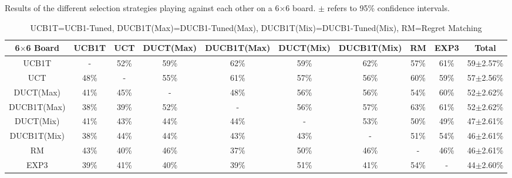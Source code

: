 \documentclass{article}
\begin{document}
\begin{table}\scriptsize
\caption{Results of the different selection strategies playing against each other on a 6$\times$6 board. $\pm$ refers to 95\% confidence intervals.}
\centering
\begin{tabular}{|c||c|c|c|c|c|c|c|c|c|}
									\hline
	6$\times$6 Board	& UCB1T 	& UCT		& DUCT(Max)	& DUCB1T(Max)	& DUCT(Mix)	& DUCB1T(Mix)	& RM	& EXP3	& Total			\\ \hline
	UCB1T							& -				& 52\%	& 59\%			& 62\%				& 59\%			& 62\%				& 57\%& 61\%	& 59$\pm$2.57\%		\\ \hline
	UCT								& 48\%		& -			& 55\%			& 61\%				& 57\%			& 56\%				& 60\%& 59\%	& 57$\pm$2.56\%		\\ \hline
	DUCT(Max)					& 41\%		& 45\%	& -					& 48\%				& 56\%			& 56\%				& 54\%& 60\%	& 52$\pm$2.62\%		\\ \hline
	DUCB1T(Max)				& 38\%		& 39\%	& 52\%			& -						& 56\%			& 57\%				& 63\%& 61\%	& 52$\pm$2.62\%		\\ \hline
	DUCT(Mix)					& 41\%		& 43\%	& 44\%			& 44\%				& -					& 53\%				& 50\%& 49\%	& 47$\pm$2.61\%		\\ \hline
	DUCB1T(Mix)				& 38\%		& 44\%	& 44\%			& 43\%				& 43\%			& -						& 51\%& 54\%	& 46$\pm$2.61\%		\\ \hline
	RM								& 43\%		& 40\%	& 46\%			& 37\%				& 50\%			& 46\%				& -		& 46\%	& 46$\pm$2.61\%		\\ \hline
	EXP3							& 39\%		& 41\%	& 40\%			& 39\%				& 51\%			& 41\%				& 54\%& -			& 44$\pm$2.60\%		\\ \hline
\end{tabular}
\caption*{UCB1T=UCB1-Tuned, DUCB1T(Max)=DUCB1-Tuned(Max), DUCB1T(Mix)=DUCB1-Tuned(Mix), RM=Regret Matching}
\label{table:rr_small}
\end{table}
\end{document}
